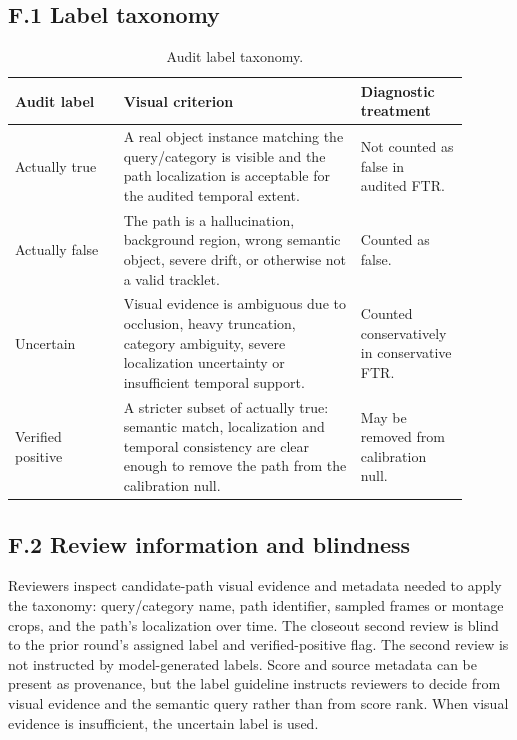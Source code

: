 \documentclass[11pt]{article}
\begin{document}
\subsection*{F.1 Label taxonomy}

\begin{table}[h]
\centering
\caption{Audit label taxonomy.}
\small
\begin{tabular}{p{0.22\linewidth}p{0.48\linewidth}p{0.20\linewidth}}
\toprule
Audit label & Visual criterion & Diagnostic treatment \\
\midrule
Actually true & A real object instance matching the query/category is visible and the path localization is acceptable for the audited temporal extent. & Not counted as false in audited FTR. \\
Actually false & The path is a hallucination, background region, wrong semantic object, severe drift, or otherwise not a valid tracklet. & Counted as false. \\
Uncertain & Visual evidence is ambiguous due to occlusion, heavy truncation, category ambiguity, severe localization uncertainty or insufficient temporal support. & Counted conservatively in conservative FTR. \\
Verified positive & A stricter subset of actually true: semantic match, localization and temporal consistency are clear enough to remove the path from the calibration null. & May be removed from calibration null. \\
\bottomrule
\end{tabular}
\end{table}

\subsection*{F.2 Review information and blindness}

Reviewers inspect candidate-path visual evidence and metadata needed to apply the taxonomy: query/category name, path identifier, sampled frames or montage crops, and the path's localization over time.
The closeout second review is blind to the prior round's assigned label and verified-positive flag.
The second review is not instructed by model-generated labels.
Score and source metadata can be present as provenance, but the label guideline instructs reviewers to decide from visual evidence and the semantic query rather than from score rank.
When visual evidence is insufficient, the uncertain label is used.
\end{document}
